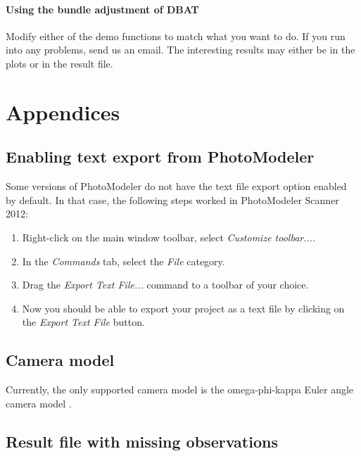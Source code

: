 \documentclass{article}
\begin{document}
\paragraph{Using the bundle adjustment of DBAT}

Modify either of the demo functions to match what you want to do. If
you run into any problems, send us an email. The interesting results
may either be in the plots or in the result file.

\newpage



\newpage

\appendix

\section{Appendices}

\subsection{Enabling text export from PhotoModeler}
\label{sec:enableTextExport}

Some versions of PhotoModeler do not have the text file export option
enabled by default. In that case, the following steps worked in
PhotoModeler Scanner 2012:
\begin{enumerate}
\item Right-click on the main window toolbar, select \emph{Customize toolbar...}.
\item In the \emph{Commands} tab, select the \emph{File} category.
\item Drag the \emph{Export Text File...} command to a toolbar of
  your choice.
\item Now you should be able to export your project as a text file by
  clicking on the \emph{Export Text File} button.
\end{enumerate}


\subsection{Camera model}

Currently, the only supported camera model is the omega-phi-kappa
Euler angle camera model \citep[Ch.~2.1.2.3]{McGlone2004:Manual}.

\subsection{Result file with missing observations}
\label{sec:missingObsResultFile}
\end{document}
